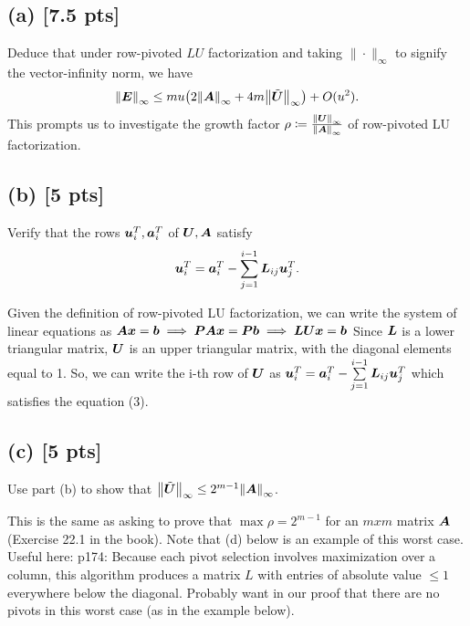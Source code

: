 \documentclass[twoside,10pt]{article}
\begin{document}
\subsection*{(a) [7.5 pts]}
Deduce that under row-pivoted $LU$ factorization and taking $\| \cdot \|_{\infty}$ to signify the vector-infinity norm, we have 
\begin{equation}
  \left\|\mtx{E}\right\|_{\infty} \leq m u \left(2 \left\|\mtx{A}\right\|_{\infty} + 4 m \left\|\tilde{\mtx{U}}\right\|_{\infty} \right) + O(u^2).
\end{equation}
This prompts us to investigate the growth factor $\rho \coloneqq \frac{\left\| \mtx{U} \right\|_{\infty}}{\left\|\mtx{A}\right\|_{\infty}}$ of row-pivoted LU factorization.

\subsection*{(b) [5 pts]}
Verify that the rows $\bm{u}_{i}^{T}, \bm{a}_{i}^{T}$ of $\bm{U}, \bm{A}$ satisfy 
\begin{equation}
  \bm{u}_{i}^{T} = \bm{a}_i^T - \sum \limits_{j = 1}^{i - 1} \bm{L}_{ij} \bm{u}_{j}^T.
\end{equation}

Given the definition of row-pivoted LU factorization, we can write the system of linear equations as 
$\bm{A} \bm{x} = \bm{b} \implies \bm{P} \bm{A} \bm{x} = \bm{P} \bm{b} \implies \bm{L} \bm{U} \bm{x} = \bm{b}$
Since $\bm{L}$ is a lower triangular matrix, $\bm{U}$ is an upper triangular matrix, with the diagonal elements equal to 1.
So, we can write the i-th row of $\bm{U}$ as 
$\bm{u}_{i}^{T} = \bm{a}_i^T - \sum \limits_{j = 1}^{i - 1} \bm{L}_{ij} \bm{u}_{j}^T$
which satisfies the equation (3).

\subsection*{(c) [5 pts]}
Use part (b) to show that $\left\|\tilde{\mtx{U}}\right\|_{\infty} \leq 2^{m - 1} \left\| \mtx{A}\right\|_{\infty}$. 


This is the same as asking to prove that $\max{\rho} = 2^{m-1}$ for an $mxm$ matrix $\bm{A}$ (Exercise 22.1 in the book).
Note that (d) below is an example of this worst case.
Useful here: p174: Because each pivot selection involves maximization over a column, this algorithm produces a matrix $L$ with entries of absolute value $\leq 1$ everywhere below the diagonal.
Probably want in our proof that there are no pivots in this worst case (as in the example below).
\end{document}
